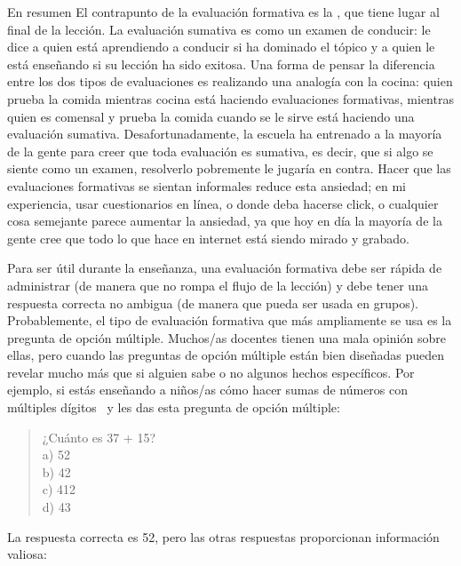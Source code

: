 \begin{aside}{En resumen}
El contrapunto de la evaluación formativa
es la ,
que tiene lugar al final de la lección.
La evaluación sumativa es como un examen de conducir:
le dice a quien está aprendiendo a conducir si ha dominado el tópico
y a quien le está enseñando si su lección ha sido exitosa.
Una forma de pensar la diferencia entre los dos tipos de evaluaciones es
realizando una analogía con la cocina:
quien prueba la comida mientras cocina está haciendo evaluaciones formativas,
mientras quien es comensal y prueba la comida cuando se le sirve está haciendo una evaluación sumativa. 
Desafortunadamente,
la escuela ha entrenado a la mayoría de la gente para creer que toda evaluación es sumativa, 
es decir, que si algo se siente como un examen,
resolverlo pobremente le jugaría en contra.
Hacer que las evaluaciones formativas se sientan informales reduce esta ansiedad;
en mi experiencia,
usar cuestionarios en línea, o donde deba hacerse click, o cualquier cosa semejante parece aumentar la ansiedad,
ya que hoy en día la mayoría de la gente cree que todo lo que hace en internet está siendo mirado y grabado.
\end{aside}
 
Para ser útil durante la enseñanza,
una evaluación formativa debe ser rápida de administrar
(de manera que no rompa el flujo de la lección)
y debe tener una respuesta correcta no ambigua
(de manera que pueda ser usada en grupos).
Probablemente, el tipo de evaluación formativa que más ampliamente se usa es
la pregunta de opción múltiple.
Muchos/as docentes tienen una mala opinión sobre ellas,
pero cuando las preguntas de opción múltiple están bien diseñadas
pueden revelar mucho más que si alguien sabe o no algunos hechos específicos.
Por ejemplo,
si estás enseñando a niños/as cómo hacer sumas de números con múltiples dígitos~\cite{Ojos2015}
y les das esta pregunta de opción múltiple:

\begin{quote}
  ¿Cuánto es 37 + 15?\\
  a) 52\\
  b) 42\\
  c) 412\\
  d) 43
\end{quote}

\noindent
La respuesta correcta es 52,
pero las otras respuestas proporcionan información valiosa:

